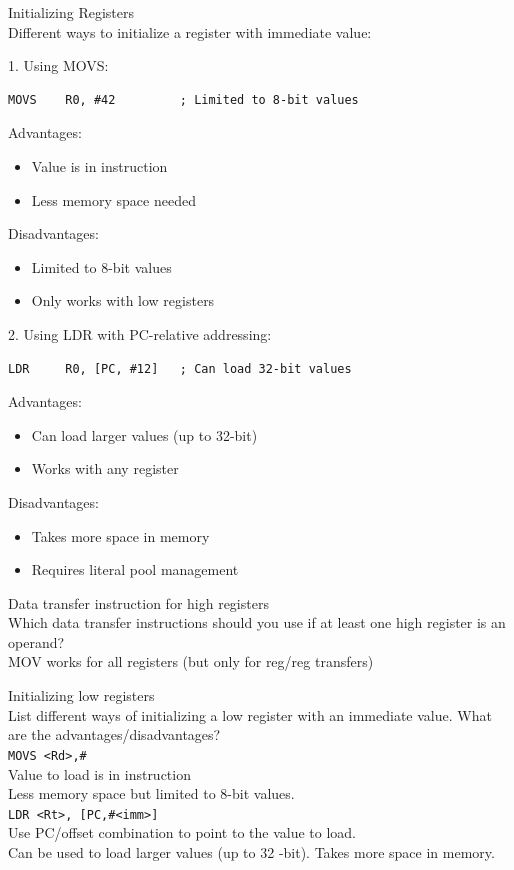 \begin{example2}{Initializing Registers}\\
Different ways to initialize a register with immediate value:

1. Using MOVS:
\begin{lstlisting}[language=armasm, style=basesmol]
MOVS    R0, #42         ; Limited to 8-bit values
\end{lstlisting}
Advantages:
\begin{itemize}
  \item Value is in instruction
  \item Less memory space needed
\end{itemize}
Disadvantages:
\begin{itemize}
  \item Limited to 8-bit values
  \item Only works with low registers
\end{itemize}

2. Using LDR with PC-relative addressing:
\begin{lstlisting}[language=armasm, style=basesmol]
LDR     R0, [PC, #12]   ; Can load 32-bit values
\end{lstlisting}
Advantages:
\begin{itemize}
  \item Can load larger values (up to 32-bit)
  \item Works with any register
\end{itemize}
Disadvantages:
\begin{itemize}
  \item Takes more space in memory
  \item Requires literal pool management
\end{itemize}
\end{example2}

\begin{example2}{Data transfer instruction for high registers}\\
Which data transfer instructions should you use if at least one high register is an operand?\\
MOV works for all registers (but only for reg/reg transfers)
\end{example2}

\begin{example2}{Initializing low registers}\\
List different ways of initializing a low register with an immediate value. What are the advantages/disadvantages?
\vspace{2mm}\\
\texttt{MOVS <Rd>,\#<imm8>}\\
Value to load is in instruction\\
Less memory space but limited to 8-bit values.
\vspace{2mm}\\
\texttt{LDR <Rt>, [PC,\#<imm>]}\\
Use PC/offset combination to point to the value to load.\\
Can be used to load larger values (up to 32 -bit). Takes more space in memory.
\end{example2}



